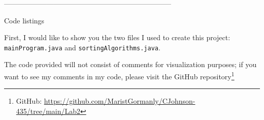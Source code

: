 \documentclass[a4paper,12pt]{article}
\begin{document}
\begin{center}
    -----------------------------------------------------------------------
\end{center}

\begin{center}
\begin{large}
    Code listings
\end{large}
\end{center}


First, I would like to show you the two files I used to create this project: \verb|mainProgram.java| and \verb|sortingAlgorithms.java|. 

\begin{footnotesize}
The code provided will not consist of comments for visualization purposes; if you want to see my comments in my code, please visit the GitHub repository\footnote{GitHub: \url{https://github.com/MaristGormanly/CJohnson-435/tree/main/Lab2}} 
\end{footnotesize}
\end{document}

